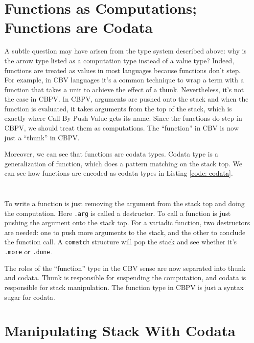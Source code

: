 \documentclass[acmsmall,nonacm]{acmart}
\begin{document}
\section{Functions as Computations; Functions are Codata}

A subtle question may have arisen from the type system described above: why is the arrow type listed as a computation type instead of a value type? Indeed, functions are treated as values in most languages because functions don't step. For example, in CBV languages it's a common technique to wrap a term with a function that takes a unit to achieve the effect of a thunk. Nevertheless, it's not the case in CBPV. In CBPV, arguments are pushed onto the stack and when the function is evaluated, it takes arguments from the top of the stack, which is exactly where Call-By-Push-Value gets its name. Since the functions do step in CBPV, we should treat them as computations. The ``function'' in CBV  is now just a ``thunk'' in CBPV.

Moreover, we can see that functions are codata types. Codata type is a generalization of function, which does a pattern matching on the stack top. We can see how functions are encoded as codata types in Listing \ref{code: codata}.

\begin{listing}[ht]
    \begin{multicols}{2}
        \inputminted{Haskell}{examples/fn_as_codata.zydeco}
        \vfill
        \inputminted{Haskell}{examples/fn_multi.zydeco}
        \vfill
    \end{multicols}
    \label{code: codata}
\end{listing}

To write a function is just removing the argument from the stack top and doing the computation. Here \texttt{.arg} is called a destructor. To call a function is just pushing the argument onto the stack top. For a variadic function, two destructors are needed: one to push more arguments to the stack, and the other to conclude the function call. A \texttt{comatch} structure will pop the stack and see whether it's \texttt{.more} or \texttt{.done}.

The roles of the ``function'' type in the CBV sense are now separated into thunk and codata. Thunk is responsible for suspending the computation, and codata is responsible for stack manipulation. The function type in CBPV is just a syntax sugar for codata.

\section{Manipulating Stack With Codata}
\end{document}
